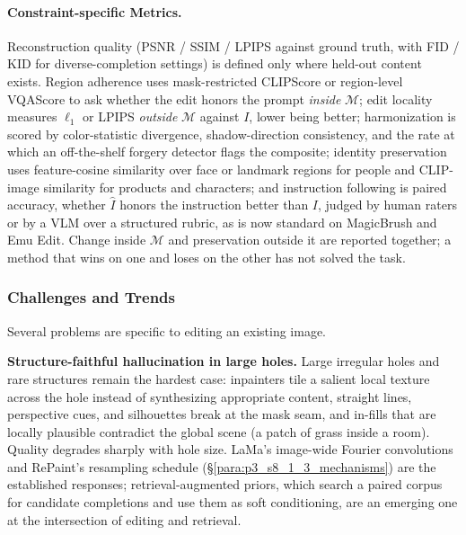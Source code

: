 \paragraph{Constraint-specific Metrics.}
Reconstruction quality (PSNR / SSIM / LPIPS against ground truth, with FID / KID for diverse-completion settings) is defined only where held-out content exists.
Region adherence uses mask-restricted CLIPScore or region-level VQAScore to ask whether the edit honors the prompt \emph{inside} $\mathcal{M}$; edit locality measures $\ell_1$ or LPIPS \emph{outside} $\mathcal{M}$ against $I$, lower being better; harmonization is scored by color-statistic divergence, shadow-direction consistency, and the rate at which an off-the-shelf forgery detector flags the composite; identity preservation uses feature-cosine similarity over face or landmark regions for people and CLIP-image similarity for products and characters; and instruction following is paired accuracy, whether $\hat{I}$ honors the instruction better than $I$, judged by human raters or by a VLM over a structured rubric, as is now standard on MagicBrush and Emu Edit.
Change inside $\mathcal{M}$ and preservation outside it are reported together; a method that wins on one and loses on the other has not solved the task.


\subsubsection{Challenges and Trends}
\label{subsubsec:p3_s8_1_3_challenges}
Several problems are specific to editing an existing image.

\textbf{Structure-faithful hallucination in large holes.}
Large irregular holes and rare structures remain the hardest case: inpainters tile a salient local texture across the hole instead of synthesizing appropriate content, straight lines, perspective cues, and silhouettes break at the mask seam, and in-fills that are locally plausible contradict the global scene (a patch of grass inside a room).
Quality degrades sharply with hole size.
LaMa's image-wide Fourier convolutions and RePaint's resampling schedule (§\ref{para:p3_s8_1_3_mechanisms}) are the established responses; retrieval-augmented priors, which search a paired corpus for candidate completions and use them as soft conditioning, are an emerging one at the intersection of editing and retrieval.

